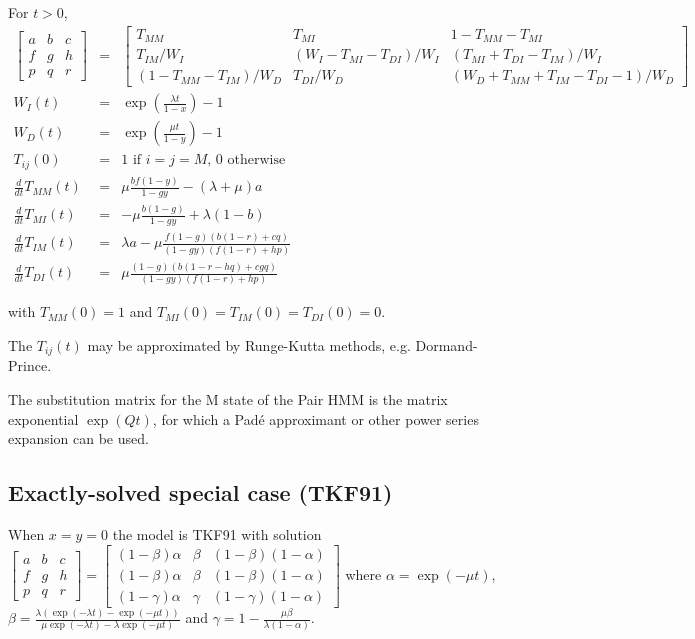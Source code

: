 \documentclass{article}
\begin{document}
For $t>0$, %
\begin{eqnarray*}
\begin{bmatrix}
a & b & c \\
f & g & h \\
p & q & r 
\end{bmatrix}
& = &
\begin{bmatrix}
T_{MM} & T_{MI} & 1-T_{MM}-T_{MI} \\
T_{IM}/W_I & (W_I-T_{MI}-T_{DI})/W_I & (T_{MI}+T_{DI}-T_{IM})/W_I \\
(1-T_{MM}-T_{IM})/W_D & T_{DI}/W_D & (W_D+T_{MM}+T_{IM}-T_{DI}-1)/W_D 
\end{bmatrix}
\\
W_I(t) & = & \exp\left(\frac{\lambda t}{1-x}\right)-1 \\
W_D(t) & = & \exp\left(\frac{\mu t}{1-y}\right)-1 \\
T_{ij}(0) & = & \mbox{1 if $i=j=M$, 0 otherwise}
\\
  \frac{d}{dt} T_{MM}(t) & = &
  \mu \frac{b f (1-y)}{1 - g y}-(\lambda +\mu )a
  \nonumber \\
  \frac{d}{dt} T_{MI}(t) & = &
  -\mu \frac{b (1-g)}{1 - g y} + \lambda (1-b)
  \nonumber \\
  \frac{d}{dt} T_{IM}(t) & = &
  \lambda a - \mu \frac{f (1-g) (b (1-r)+c q)}{(1 - g y) (f (1-r)+h p)}
  \nonumber \\
  \frac{d}{dt} T_{DI}(t) & = &
  \mu \frac{(1-g) (b (1-r-h q)+c g q)}{(1-g y) (f (1-r)+h p)}
\end{eqnarray*}

with $T_{MM}(0)=1$ and $T_{MI}(0)=T_{IM}(0)=T_{DI}(0)=0$.

The $T_{ij}(t)$ may be approximated by Runge-Kutta methods,
e.g. Dormand-Prince. %

The substitution matrix for the M state of the Pair HMM is
the matrix exponential $\exp(Qt)$, for which a Pad\'{e} approximant
or other power series expansion can be used. %


\subsection{Exactly-solved special case (TKF91)}

When $x=y=0$ the model is TKF91 \cite{ThorneEtAl91}
with solution
$
\begin{bmatrix}
a & b & c \\
f & g & h \\
p & q & r 
\end{bmatrix}
=
\begin{bmatrix}
(1-\beta)\alpha & \beta & (1-\beta)(1-\alpha) \\
(1-\beta)\alpha & \beta & (1-\beta)(1-\alpha) \\
(1-\gamma)\alpha & \gamma & (1-\gamma)(1-\alpha)
\end{bmatrix}
$
where
$\alpha = \exp(-\mu t)$,
$\beta = \frac{\lambda \left( \exp(-\lambda t) - \exp(-\mu t) \right)}{\mu \exp(-\lambda t) - \lambda \exp(-\mu t)}$
and
$\gamma = 1 - \frac{\mu \beta}{\lambda (1 - \alpha)}$.
\end{document}
